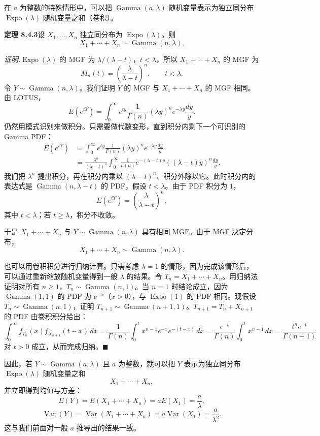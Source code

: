 \documentclass[UTF8, 12pt, fontset=fandol, oneside]{ctexart}
\begin{document}
在 $a$ 为整数的特殊情形中，可以把 $\operatorname{Gamma}(a,\lambda)$ 随机变量表示为独立同分布 $\operatorname{Expo}(\lambda)$ 随机变量之和（卷积）。

\noindent\textbf{定理 8.4.3}\quad 设 $X_1,\ldots,X_n$ 独立同分布为 $\operatorname{Expo}(\lambda)$。则
\[
  X_1+\cdots+X_n\sim\operatorname{Gamma}(n,\lambda).
\]

\noindent\textit{证明.}\quad $\operatorname{Expo}(\lambda)$ 的 MGF 为 $\lambda/(\lambda-t)$，$t<\lambda$，所以 $X_1+\cdots+X_n$ 的 MGF 为
\[
  M_n(t)=\left(\frac{\lambda}{\lambda-t}\right)^n,\qquad t<\lambda.
\]
令 $Y\sim\operatorname{Gamma}(n,\lambda)$。我们证明 $Y$ 的 MGF 与 $X_1+\cdots+X_n$ 的 MGF 相同。由 LOTUS，
\[
  E(e^{tY})=\int_0^\infty e^{ty}\frac{1}{\Gamma(n)}(\lambda y)^n e^{-\lambda y}\frac{dy}{y}.
\]
仍然用模式识别来做积分。只需要做代数变形，直到积分内剩下一个可识别的 Gamma PDF：
\[
\begin{aligned}
  E(e^{tY})
  &=\int_0^\infty e^{ty}\frac{1}{\Gamma(n)}(\lambda y)^n e^{-\lambda y}\frac{dy}{y}\\
  &=\frac{\lambda^n}{(\lambda-t)^n}
    \int_0^\infty \frac1{\Gamma(n)}e^{-(\lambda-t)y}((\lambda-t)y)^n\frac{dy}{y}.
\end{aligned}
\]
我们把 $\lambda^n$ 提出积分，再在积分内乘以 $(\lambda-t)^n$、积分外除以它。此时积分内的表达式是 $\operatorname{Gamma}(n,\lambda-t)$ 的 PDF，假设 $t<\lambda$。由于 PDF 积分为 $1$，
\[
  E(e^{tY})=\left(\frac{\lambda}{\lambda-t}\right)^n,
\]
其中 $t<\lambda$；若 $t\ge\lambda$，积分不收敛。

于是 $X_1+\cdots+X_n$ 与 $Y\sim\operatorname{Gamma}(n,\lambda)$ 具有相同 MGF。由于 MGF 决定分布，
\[
  X_1+\cdots+X_n\sim\operatorname{Gamma}(n,\lambda).
\]

也可以用卷积积分进行归纳计算。只需考虑 $\lambda=1$ 的情形，因为完成该情形后，可以通过重新缩放随机变量得到一般 $\lambda$ 的结果。令 $T_n=X_1+\cdots+X_n$。用归纳法证明对所有 $n\ge1$，$T_n\sim\operatorname{Gamma}(n,1)$。当 $n=1$ 时结论成立，因为 $\operatorname{Gamma}(1,1)$ 的 PDF 为 $e^{-x}$（$x>0$），与 $\operatorname{Expo}(1)$ 的 PDF 相同。现假设 $T_n\sim\operatorname{Gamma}(n,1)$，证明 $T_{n+1}\sim\operatorname{Gamma}(n+1,1)$。$T_{n+1}=T_n+X_{n+1}$ 的 PDF 由卷积积分给出：
\[
  \int_0^\infty f_{T_n}(x)f_{X_{n+1}}(t-x)\,dx
  =
  \frac{1}{\Gamma(n)}\int_0^t x^{n-1}e^{-x}e^{-(t-x)}\,dx
  =
  \frac{e^{-t}}{\Gamma(n)}\int_0^t x^{n-1}\,dx
  =
  \frac{t^n e^{-t}}{\Gamma(n+1)}
\]
对 $t>0$ 成立，从而完成归纳。$\blacksquare$

因此，若 $Y\sim\operatorname{Gamma}(a,\lambda)$ 且 $a$ 为整数，就可以把 $Y$ 表示为独立同分布 $\operatorname{Expo}(\lambda)$ 随机变量之和
\[
  X_1+\cdots+X_a,
\]
并立即得到均值与方差：
\[
  E(Y)=E(X_1+\cdots+X_a)=aE(X_1)=\frac{a}{\lambda},
\]
\[
  \operatorname{Var}(Y)=\operatorname{Var}(X_1+\cdots+X_a)=a\operatorname{Var}(X_1)=\frac{a}{\lambda^2}.
\]
这与我们前面对一般 $a$ 推导出的结果一致。
\end{document}
